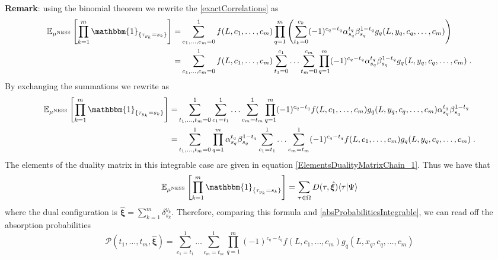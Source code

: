 \documentclass[10pt]{article}
\numberwithin{equation}{section}
\numberwithin{equation}{subsection}
\newcommand{\dt}{\;.}
\begin{document}
\textbf{Remark}: using the binomial theorem we rewrite the \eqref{exactCorrelations} as 
\begin{equation}
\begin{split}
\mathbb{E}_{\mu^{\text{NESS}}}\left[\prod_{k=1}^{m}\mathbbm{1}_{\{\tau_{y_{k}}=s_{k}\}}\right]=&
\sum_{c_{1},\ldots,c_{m}=0}^{1}
f(L,c_{1},\ldots,c_{m})\prod_{q=1}^{m}\left(\sum_{t_{k}=0}^{c_{k}}(-1)^{c_{q}-t_{q}}\alpha_{s_{q}}^{t_{q}}\beta_{s_{q}}^{1-t_{q}}g_{q}(L,y_{q},c_{q},\ldots,c_{m})\right)\\
=&\sum_{c_{1},\ldots,c_{m}=0}^{1}
f(L,c_{1},\ldots,c_{m})\sum_{t_{1}=0}^{c_{1}}\ldots\sum_{t_{m}=0}^{c_{m}}\prod_{q=1}^{m}(-1)^{c_{q}-t_{q}}\alpha_{s_{q}}^{t_{q}}\beta_{s_{q}}^{1-t_{q}}g_{q}(L,y_{q},c_{q},\ldots,c_{m})\dt
\end{split}
\end{equation}
By exchanging the summations we rewrite as 
\begin{equation}
\begin{split}
\mathbb{E}_{\mu^{\text{NESS}}}\left[\prod_{k=1}^{m}\mathbbm{1}_{\{\tau_{y_{k}}=s_{k}\}}\right]=&\sum_{t_{1},\ldots,t_{m}=0}^{1}
\sum_{c_{1}=t_{1}}^{1}\ldots\sum_{c_{m}=t_{m}}^{1}\prod_{q=1}^{m}(-1)^{c_{q}-t_{q}}f(L,c_{1},\ldots,c_{m})g_{q}(L,y_{q},c_{q},\ldots,c_{m})\alpha_{s_{q}}^{t_{q}}\beta_{s_{q}}^{1-t_{q}}\\
=&\sum_{t_{1},\ldots,t_{m}=0}^{1}\prod_{q=1}^{m}\alpha_{s_{q}}^{t_{q}}\beta_{s_{q}}^{1-t_{q}}\sum_{c_{1}=t_{1}}^{1}\ldots\sum_{c_{m}=t_{m}}^{1}(-1)^{c_{q}-t_{q}}f(L,c_{1},\ldots,c_{m})g_{q}(L,y_{q},c_{q},\ldots,c_{m})\dt
\end{split}
\end{equation}
The elements of the duality matrix in this integrable case are given in equation \eqref{ElementsDualityMatrixChain_1}. Thus we have that 
\begin{align}
	\mathbb{E}_{\mu^{\text{NESS}}}\left[\prod_{k=1}^{m}\mathbbm{1}_{\{\tau_{y_{k}}=s_{k}\}}\right]=\sum_{\bm{\tau}\in \Omega}D(\tau,\hat{\bm{\xi}})\langle\tau|\Psi\rangle
\end{align}
where the dual configuration is $\hat{\bm{\xi}}=\sum_{k=1}^{m}\delta^{y_{k}}_{s_{k}}$. 
Therefore, comparing this formula and \eqref{absProbabilitiesIntegrable}, we can read off the absorption probabilities 
\begin{equation}
	\mathcal{P}(t_{1},\ldots,t_{m},\hat{\bm{\xi}})=\sum_{c_{1}=t_{1}}^{1}\ldots\sum_{c_{m}=t_{m}}^{1}\prod_{q=1}^{m}(-1)^{c_{q}-t_{q}}f(L,c_{1},\ldots,c_{m})g_{q}(L,x_{q},c_{q},\ldots,c_{m})
\end{equation}
\end{document}
